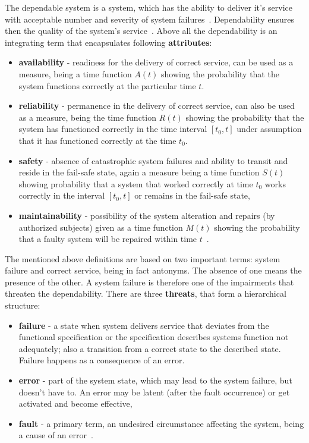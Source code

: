 \documentclass[]{myclass}
\begin{document}
The dependable system is a system, which has the ability to deliver it's service with acceptable number and severity of system failures~\cite{art:Avizienis}. Dependability ensures then the quality of the system's service~\cite{art:Laprie}. Above all the dependability is an integrating term that encapsulates following \textbf{attributes}:
\begin{itemize}
\item \textbf{availability} - readiness for the delivery of correct service, can be used as a  measure, being a time function $A(t)$ showing the probability that the system functions correctly at the particular time $t$. 
\item \textbf{reliability} - permanence in the delivery of correct service, can also be used as a measure, being the time function $R(t)$ showing the probability that the system has functioned correctly in the time interval $[t_0,t]$ under assumption that it has functioned correctly at the time $t_0$.
\item \textbf{safety} - absence of catastrophic system failures and ability to transit and reside in the fail-safe state, again a measure being a time function $S(t)$ showing probability that a system that worked correctly at time $t_0$ works correctly in the interval $[t_0,t]$ or remains in the fail-safe state,
\item \textbf{maintainability} - possibility of the system alteration and repairs (by authorized subjects) given as a time function $M(t)$ showing the probability that a faulty system will be repaired within time $t$~\cite{art:Laprie, art:Avizienis}.
\end{itemize}
The mentioned above definitions are based on two important terms: system failure and correct service, being in fact antonyms. The absence of one means the presence of the other. A system failure is therefore one of the impairments that threaten the dependability. There are three \textbf{threats}, that form a hierarchical structure:
\begin{itemize}
    \item \textbf{failure} - a state when system delivers service that deviates from the functional specification or the specification describes systems function not adequately; also a transition from a correct state to the described state. Failure happens as a consequence of an error.
    \item \textbf{error} - part of the system state, which may lead to the system failure, but doesn't have to. An error may be latent (after the fault occurrence) or get activated and become effective,
    \item \textbf{fault} - a primary term, an undesired circumstance affecting the system, being a cause of an error~\cite{art:Avizienis}. 
\end{itemize}
\end{document}
